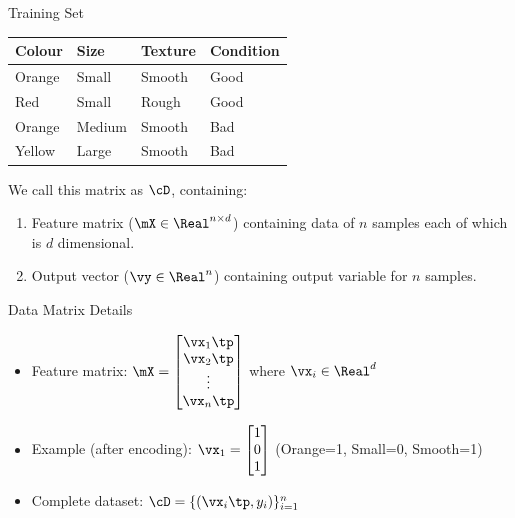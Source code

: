 \documentclass[usenames,dvipsnames]{beamer}
\begin{document}
\begin{frame}{Training Set}
\vspace{-5pt}
\begin{table}[]
	\begin{tabular}{|l|l|l||l|}
		\hline 
		\rowcolor{white}
		\textbf{Colour} & \textbf{Size} & \textbf{Texture} & \textbf{Condition} \\ \hline 
		Orange & Small & Smooth  & Good      \\
		Red    & Small  & Rough  & Good \\
		Orange & Medium & Smooth & Bad \\
		Yellow & Large  & Smooth & Bad \\ \hline 
		
	\end{tabular}
\end{table}


\pause We call this matrix as $\cD$, containing:
\begin{enumerate}
	\item Feature matrix ($\mX \in \Real^{n \times d}$) containing data of $n$ samples each of which is $d$ dimensional.
	\item Output vector ($\vy \in \Real^n$) containing output variable for $n$ samples.
\end{enumerate}

\end{frame}

\begin{frame}{Data Matrix Details}
\begin{itemize}
	\item Feature matrix: $\mX = \begin{bmatrix} \vx_1\tp \\ \vx_2\tp \\ \vdots \\ \vx_n\tp \end{bmatrix}$ where $\vx_i \in \Real^d$
	\item \pause Example (after encoding): $\vx_1 = \begin{bmatrix}
	1 \\ 
	0 \\
	1 \\
	\end{bmatrix}$ (Orange=1, Small=0, Smooth=1)
	\item \pause Complete dataset: $\cD = \{(\vx_i\tp, y_i)\}_{i=1}^n$
\end{itemize}

\end{frame}
\end{document}
